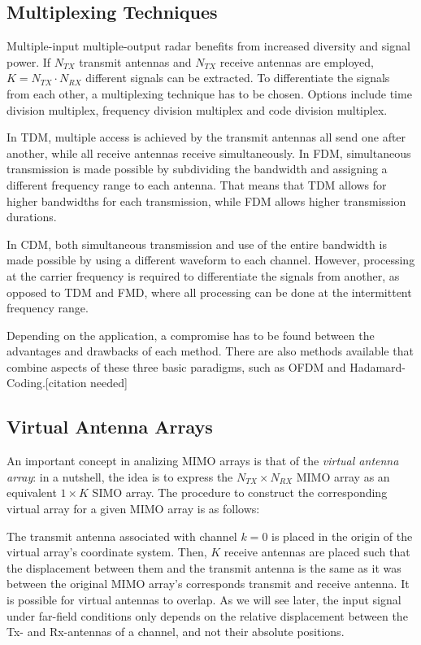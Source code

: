 \subsection{Multiplexing Techniques}
Multiple-input multiple-output radar benefits from increased diversity and signal power.
If $N_{TX}$ transmit antennas and $N_{TX}$ receive antennas are employed, $K=N_{TX} \cdot N_{RX}$ different signals can be extracted.
To differentiate the signals from each other, a multiplexing technique has to be chosen.
Options include time division multiplex, frequency division multiplex and code division multiplex.

In TDM, multiple access is achieved by the transmit antennas all send one after another,
while all receive antennas receive simultaneously.
In FDM, simultaneous transmission is made possible by subdividing the bandwidth and assigning a different frequency range to each antenna.
That means that TDM allows for higher bandwidths for each transmission, while FDM allows higher transmission durations.

In CDM, both simultaneous transmission and use of the entire bandwidth is made possible by using a different waveform to each channel.
However, processing at the carrier frequency is required to differentiate the signals from another, as opposed to TDM and FMD,
where all processing can be done at the intermittent frequency range.

Depending on the application, a compromise has to be found between the advantages and drawbacks of each method.
There are also methods available that combine aspects of these three basic paradigms, such as OFDM and Hadamard-Coding.[citation needed] \\

\subsection{Virtual Antenna Arrays}
An important concept in analizing MIMO arrays is that of the \emph{virtual antenna array}:
in a nutshell, the idea is to express the $N_{TX} \times N_{RX}$ MIMO array as an equivalent $1\times K$ SIMO array.
The procedure to construct the corresponding virtual array for a given MIMO array is as follows:

The transmit antenna associated with channel $k=0$ is placed in the origin of the virtual array's coordinate system.
Then, $K$ receive antennas are placed such that the displacement between them and the transmit antenna
is the same as it was between the original MIMO array's corresponds transmit and receive antenna.
It is possible for virtual antennas to overlap. 
As we will see later, the input signal under far-field conditions only depends 
on the relative displacement between the Tx- and Rx-antennas of a channel, and not their absolute positions.

